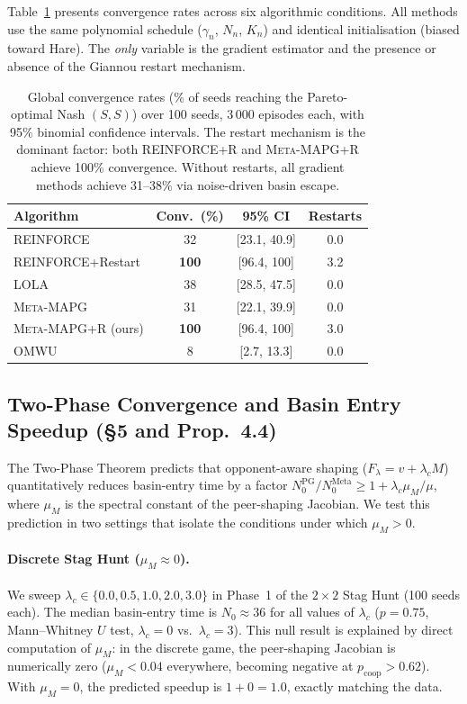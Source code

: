 \documentclass[11pt,a4paper]{article}
\newcommand{\MAPG}{\textsc{Meta-MAPG}}
\newcommand{\OUR}{\textsc{Meta-MAPG+R}}
\theoremstyle{remark}
\begin{document}
Table~\ref{tab:matrix_convergence} presents convergence rates across six
algorithmic conditions. All methods use the same polynomial schedule
($\gamma_n$, $N_n$, $K_n$) and identical initialisation (biased toward Hare).
The \emph{only} variable is the gradient estimator and the presence or absence
of the Giannou restart mechanism.

\begin{table}[H]
  \centering
  \caption{%
    Global convergence rates (\% of seeds reaching the Pareto-optimal Nash
    $(S,S)$) over 100 seeds, 3\,000 episodes each, with 95\% binomial
    confidence intervals. The restart mechanism is the dominant factor:
    both REINFORCE+R and \OUR{} achieve 100\% convergence.
    Without restarts, all gradient methods achieve 31--38\% via
    noise-driven basin escape.
  }
  \label{tab:matrix_convergence}
  \setlength{\tabcolsep}{8pt}
  \begin{tabular}{lccc}
    \toprule
    \textbf{Algorithm} & \textbf{Conv.~(\%)} & \textbf{95\% CI} & \textbf{Restarts} \\
    \midrule
    REINFORCE           & 32  & [23.1, 40.9] & 0.0 \\
    REINFORCE+Restart   & \textbf{100} & [96.4, 100] & 3.2 \\
    LOLA                & 38  & [28.5, 47.5] & 0.0 \\
    \MAPG{}             & 31  & [22.1, 39.9] & 0.0 \\
    \OUR{} (ours)       & \textbf{100} & [96.4, 100] & 3.0 \\
    OMWU                &  8  & [2.7, 13.3]  & 0.0 \\
    \bottomrule
  \end{tabular}
\end{table}

\subsection{Two-Phase Convergence and Basin Entry Speedup (\S5 and Prop.~4.4)}
\label{sec:two_phase}

The Two-Phase Theorem predicts that opponent-aware shaping ($F_\lambda = v + \lambda_c M$) quantitatively reduces basin-entry time by a factor $N_0^{\text{PG}} / N_0^{\text{Meta}} \ge 1 + \lambda_c \mu_M / \mu$, where $\mu_M$ is the spectral constant of the peer-shaping Jacobian. We test this prediction in two settings that isolate the conditions under which $\mu_M > 0$.

\paragraph{Discrete Stag Hunt ($\mu_M \approx 0$).}
We sweep $\lambda_c \in \{0.0, 0.5, 1.0, 2.0, 3.0\}$ in Phase~1 of the $2\times2$ Stag Hunt (100 seeds each). The median basin-entry time is $N_0 \approx 36$ for all values of $\lambda_c$ ($p = 0.75$, Mann--Whitney $U$ test, $\lambda_c{=}0$ vs.\ $\lambda_c{=}3$). This null result is explained by direct computation of $\mu_M$: in the discrete game, the peer-shaping Jacobian is numerically zero ($\mu_M < 0.04$ everywhere, becoming negative at $p_{\text{coop}} > 0.62$). With $\mu_M = 0$, the predicted speedup is $1 + 0 = 1.0$, exactly matching the data.
\end{document}

